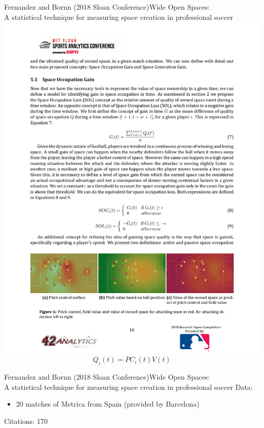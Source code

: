 \documentclass{beamer}
\begin{document}
  \begin{frame}{Fernandez and Bornn (2018 Sloan Conference)}{Wide Open Spaces:\\ A statistical technique for measuring space creation in professional soccer}
    \centering
    \includegraphics[width = \textwidth]{images/fernandez_bornn_2018.pdf}\\
    $$Q_i(t) = PC_i(t)V(t)$$
  \end{frame}

  \begin{frame}{Fernandez and Bornn (2018 Sloan Conference)}{Wide Open Spaces:\\ A statistical technique for measuring space creation in professional soccer}
    Data:
    \begin{itemize}
      \item 20 matches of Metrica from Spain (provided by Barcelona)
    \end{itemize}
    Citations: 170
  \end{frame}
\end{document}

